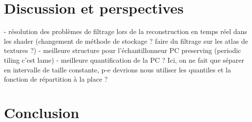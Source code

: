 \Conclusion \label{chap:conclusion}

\section{Discussion et perspectives}

- résolution des problèmes de filtrage lors de la reconstruction en temps réel dans les shader (changement de méthode de stockage ? faire du filtrage sur les atlas de textures ?)
- meilleure structure pour l'échantillonneur PC preserving (periodic tiling c'est lame)
- meilleure quantification de la PC ? Ici, on ne fait que séparer en intervalle de taille constante, p-e devrions nous utiliser les quantiles et la fonction de répartition à la place ?


\section{Conclusion}
